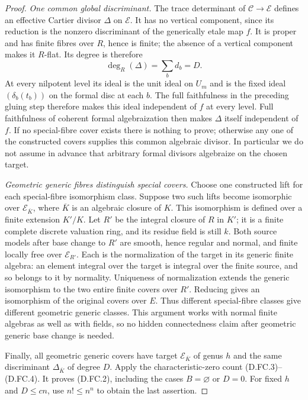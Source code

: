 \begin{proof}
\emph{One common global discriminant.}
The trace determinant of $\mathcal C\to\mathcal E$ defines an
effective Cartier divisor $\mathcal\Delta$ on $\mathcal E$.
It has no vertical component, since its reduction is the
nonzero discriminant of the generically etale map $f$.
It is proper and has finite fibres over $R$, hence is finite;
the absence of a vertical component makes it $R$-flat.
Its degree is therefore
\[
                     \deg_R(\mathcal\Delta)=\sum_b d_b=D.         \tag{D.FC.7}
\]
At every nilpotent level its ideal is the unit ideal on $U_m$
and is the fixed ideal $(\delta_b(t_b))$ on the formal disc at
each $b$. The full faithfulness in the preceding gluing step
therefore makes this ideal independent of $f$ at every level.
Full faithfulness of coherent formal algebraization then makes
$\mathcal\Delta$ itself independent of $f$.
If no special-fibre cover exists there is nothing to prove;
otherwise any one of the constructed covers supplies this common
algebraic divisor. In particular we do not assume in advance
that arbitrary formal divisors algebraize on the chosen target.

\emph{Geometric generic fibres distinguish special covers.}
Choose one constructed lift for each special-fibre isomorphism
class. Suppose two such lifts become isomorphic over
$\mathcal E_{\overline K}$, where $\overline K$ is an algebraic
closure of $K$. This isomorphism is defined over a finite
extension $K'/K$. Let $R'$ be the integral closure of $R$ in
$K'$; it is a finite complete discrete valuation ring, and its
residue field is still $k$. Both source models after base change
to $R'$ are smooth, hence regular and normal, and finite locally
free over $\mathcal E_{R'}$. Each is the normalization of the
target in its generic finite algebra: an element integral over
the target is integral over the finite source, and so belongs
to it by normality. Uniqueness of normalization extends the
generic isomorphism to the two entire finite covers over $R'$.
Reducing gives an isomorphism of the original covers over $E$.
Thus different special-fibre classes give different geometric
generic classes. This argument works with normal finite
algebras as well as with fields, so no hidden connectedness
claim after geometric generic base change is needed.

Finally, all geometric generic covers have target
$\mathcal E_{\overline K}$ of genus $h$ and the same discriminant
$\mathcal\Delta_{\overline K}$ of degree $D$. Apply the
characteristic-zero count (D.FC.3)--(D.FC.4). It proves
(D.FC.2), including the cases $B=\varnothing$ or $D=0$.
For fixed $h$ and $D\le cn$, use $n!\le n^n$ to obtain
the last assertion.
\end{proof}

